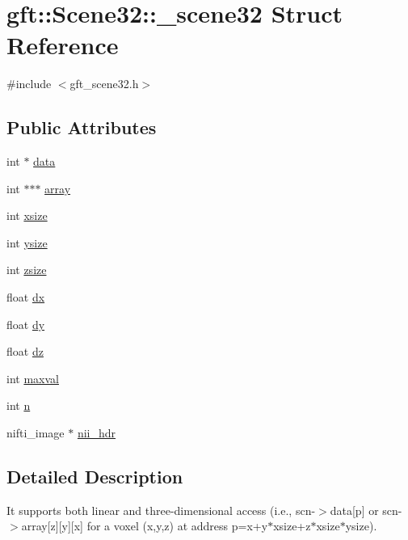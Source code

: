 \hypertarget{structgft_1_1Scene32_1_1__scene32}{\section{gft\-:\-:Scene32\-:\-:\-\_\-scene32 Struct Reference}
\label{structgft_1_1Scene32_1_1__scene32}
}


{\ttfamily \#include $<$gft\-\_\-scene32.\-h$>$}

\subsection*{Public Attributes}
\begin{DoxyCompactItemize}
\item 
int $\ast$ \hyperlink{structgft_1_1Scene32_1_1__scene32_ad8f0a2cac9d910500269fca4e8c435fa}{data}
\item 
int $\ast$$\ast$$\ast$ \hyperlink{structgft_1_1Scene32_1_1__scene32_a438883984869d1b9716fb7d8bee74b56}{array}
\item 
int \hyperlink{structgft_1_1Scene32_1_1__scene32_a89930668fe4a94196d383cd25abec2a9}{xsize}
\item 
int \hyperlink{structgft_1_1Scene32_1_1__scene32_aa77d48ddba1f5845e63aa4f14d78aeaa}{ysize}
\item 
int \hyperlink{structgft_1_1Scene32_1_1__scene32_af18d678198189cc926207beba928dedd}{zsize}
\item 
float \hyperlink{structgft_1_1Scene32_1_1__scene32_aaba85b569f07295bbaf686c0d1df304d}{dx}
\item 
float \hyperlink{structgft_1_1Scene32_1_1__scene32_a929d2abebc85a0d848cd3cc0d34fc93a}{dy}
\item 
float \hyperlink{structgft_1_1Scene32_1_1__scene32_a76e9c55696d214a152b875824dda6825}{dz}
\item 
int \hyperlink{structgft_1_1Scene32_1_1__scene32_a42b25d5d4256cf65b3c4d75afd5d7f0b}{maxval}
\item 
int \hyperlink{structgft_1_1Scene32_1_1__scene32_ab97e3e918bb4d87db5f493cd9c13757f}{n}
\item 
nifti\-\_\-image $\ast$ \hyperlink{structgft_1_1Scene32_1_1__scene32_aa0167371c596e5754402dfd7f6ede5f8}{nii\-\_\-hdr}
\end{DoxyCompactItemize}


\subsection{Detailed Description}
It supports both linear and three-\/dimensional access (i.\-e., scn-\/$>$data\mbox{[}p\mbox{]} or scn-\/$>$array\mbox{[}z\mbox{]}\mbox{[}y\mbox{]}\mbox{[}x\mbox{]} for a voxel (x,y,z) at address p=x+y$\ast$xsize+z$\ast$xsize$\ast$ysize). 

